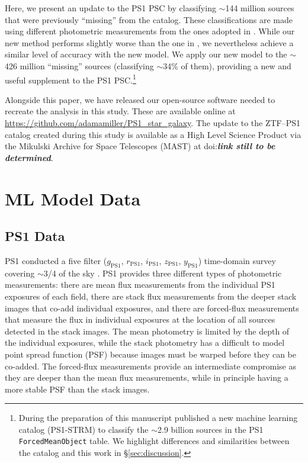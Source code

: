 \documentclass[twocolumn]{aastex63}
\begin{document}
Here, we present an update to the PS1 PSC by classifying $\sim$144 million
sources that were previously ``missing'' from the catalog. These
classifications are made using different photometric measurements from the
ones adopted in \citet{Tachibana18}. While our new method performs slightly
worse than the one in \citet{Tachibana18}, we nevertheless achieve a similar
level of accuracy with the new model. We apply our new model to the $\sim$426
million ``missing'' sources (classifying $\sim$34\% of them), providing a new
and useful supplement to the PS1 PSC.\footnote{During the preparation of this
manuscript \citet{Beck20} published a new machine learning catalog (PS1-STRM)
to classify the $\sim$2.9 billion sources in the PS1 \texttt{ForcedMeanObject}
table. We highlight differences and similarities between the
\citeauthor{Beck20} catalog and this work in \S\ref{sec:discussion}.}

Alongside this paper, we have released our open-source software needed to
recreate the analysis in this study. These are available online at
\url{https://github.com/adamamiller/PS1_star_galaxy}. The update to the
ZTF–PS1 catalog created during this study is available as a High Level
Science Product via the Mikulski Archive for Space Telescopes (MAST) at
doi:\textbf{\textit{link still to be determined}}.

\section{ML Model Data}

\subsection{PS1 Data}

PS1 conducted a five filter ($g_\mathrm{PS1}$, $r_\mathrm{PS1}$,
$i_\mathrm{PS1}$, $z_\mathrm{PS1}$, $y_\mathrm{PS1}$) time-domain survey
covering $\sim$3/4 of the sky \citep{Chambers16}. PS1 provides three different
types of photometric measurements: there are mean flux measurements from the
individual PS1 exposures of each field, there are stack flux measurements from
the deeper stack images that co-add individual exposures, and there are
forced-flux measurements that measure the flux in individual exposures at the
location of all sources detected in the stack images. The mean photometry is
limited by the depth of the individual exposures, while the stack photometry
has a difficult to model point spread function (PSF) because images must be
warped before they can be co-added. The forced-flux measurements provide an
intermediate compromise as they are deeper than the mean flux measurements,
while in principle having a more stable PSF than the stack images.
\end{document}
